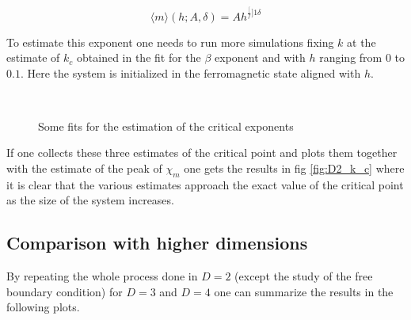 \documentclass[a4paper, 11pt]{article}
\begin{document}
      \begin{equation}
        \langle m \rangle (h;A,\delta) = Ah^{\frac[f]{1}{\delta}}
      \end{equation}

      To estimate this exponent one needs to run more simulations fixing $k$ at the estimate of $k_c$ obtained in the fit for the $\beta$ exponent and with $h$ ranging from $0$ to $0.1$. Here the system is initialized in the ferromagnetic state aligned with $h$.

      \begin{figure}[H]
        \centering
        \begin{subfigure}[Fit of the specific heat: estimation of $\alpha_1$, $\alpha_2$.]{
          \label{fig:D2_alpha}}
        \end{subfigure}
        \begin{subfigure}[Fit of the magnetization with respect to $k$ at $h = 0$: estimation of $\beta$.]{
          \label{fig:D2_beta}}
        \end{subfigure}\\
        \begin{subfigure}[Fit of the magnetic susceptibility: estimation of $\gamma_1$, $\gamma_2$.]{
          \label{fig:D2_gamma}}
        \end{subfigure}
        \begin{subfigure}[Fit of the magnetization with respect to $h$ at $k = k_c$: estimation of $\delta$.]{
          \label{fig:D2_delta}}
        \end{subfigure}
        \caption{Some fits for the estimation of the critical exponents}
      \end{figure}

      If one collects these three estimates of the critical point and plots them together with the estimate of the peak of $\chi_m$ one gets the results in fig \ref{fig:D2_k_c} where it is clear that the various estimates approach the exact value of the critical point as the size of the system increases.


    \subsection{Comparison with higher dimensions}
      By repeating the whole process done in $D=2$ (except the study of the free boundary condition) for $D = 3$ and $D = 4$ one can summarize the results in the following plots.
\end{document}
